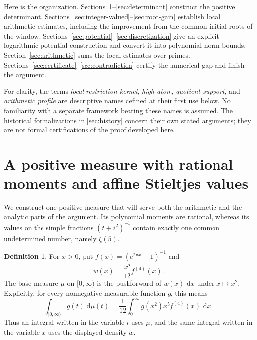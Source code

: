 \documentclass[11pt,letterpaper]{article}
\theoremstyle{definition}
\newtheorem{definition}[definition]{Definition}
\newcommand{\dd}{\,\mathrm d}
\begin{document}
Here is the organization. Sections~\ref{sec:functional}--\ref{sec:determinant}
construct the positive determinant.
Sections~\ref{sec:integer-valued}--\ref{sec:root-gain} establish local
arithmetic estimates, including the improvement from the common initial
roots of the window.
Sections~\ref{sec:potential}--\ref{sec:discretization} give an explicit
logarithmic-potential construction and convert it into polynomial norm
bounds.
Section~\ref{sec:arithmetic} sums the local estimates over primes.
Sections~\ref{sec:certificate}--\ref{sec:contradiction} certify the numerical
gap and finish the argument.

For clarity, the terms \emph{local restriction kernel}, \emph{high atom},
\emph{quotient support}, and \emph{arithmetic profile} are descriptive names
defined at their first use below. No familiarity with a separate framework
bearing these names is assumed. The historical formalizations in
\cref{sec:history} concern their own stated arguments; they are not formal
certifications of the proof developed here.


\section{A positive measure with rational moments and affine Stieltjes values}\label{sec:functional}

We construct one positive measure that will serve both the arithmetic and
the analytic parts of the argument. Its polynomial moments are rational,
whereas its values on the simple fractions $(t+i^2)^{-1}$ contain exactly
one common undetermined number, namely $\zeta(5)$.

\begin{definition}\label{def:physical-measure}
For $x>0$, put $f(x)=(e^{2\pi x}-1)^{-1}$ and
\[
 w(x)=\frac{x^5}{12}f^{(4)}(x).
\]
The base measure $\mu$ on $[0,\infty)$ is the pushforward of
$w(x)\,\dd x$ under $x\mapsto x^2$. Explicitly, for every nonnegative
measurable function $g$, this means
\begin{equation}\label{eq:physical-measure}
 \int_{[0,\infty)}g(t)\,\dd\mu(t)
 =\frac1{12}\int_0^\infty g(x^2)x^5f^{(4)}(x)\,\dd x.
\end{equation}
Thus an integral written in the variable $t$ uses $\mu$, and the same
integral written in the variable $x$ uses the displayed density $w$.
\end{definition}
\end{document}
